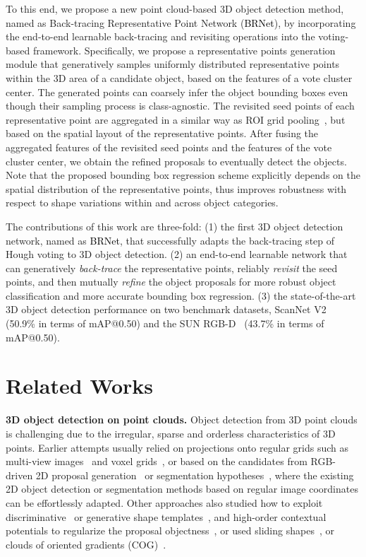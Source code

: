 \documentclass[final]{cvpr}
\newcommand{\methodnospace}{\textcolor{black}{BRNet}}
\begin{document}
To this end, we propose a new point cloud-based 3D object detection method, named as Back-tracing Representative Point Network (\methodnospace), by incorporating the end-to-end learnable back-tracing and revisiting operations into the voting-based framework.
Specifically, we propose a representative points generation module that generatively samples uniformly distributed representative points within the 3D area of a candidate object, based on the features of a vote cluster center.
The generated points can coarsely infer the object bounding boxes even though their sampling process is class-agnostic.
The revisited seed points of each representative point are aggregated in a similar way as ROI grid pooling~\cite{pvrcnn}, but based on the spatial layout of the representative points.
After fusing the aggregated features of the revisited seed points and the features of the vote cluster center, we obtain the refined proposals to eventually detect the objects.
Note that the proposed bounding box regression scheme explicitly depends on the spatial distribution of the representative points, thus improves robustness with respect to shape variations within and across object categories.

The contributions of this work are three-fold:
(1) the first 3D object detection network, named as \methodnospace, that successfully adapts the back-tracing step of Hough voting to 3D object detection.
(2) an end-to-end learnable network that can generatively \emph{back-trace} the representative points, reliably \emph{revisit} the seed points, and then mutually \emph{refine} the object proposals for more robust object classification and more accurate bounding box regression.
(3) the state-of-the-art 3D object detection performance on two benchmark datasets, ScanNet V2~\cite{scannet} (50.9\% in terms of mAP@0.50) and the SUN RGB-D~\cite{sunrgb-d} (43.7\% in terms of mAP@0.50).

\section{Related Works}
\label{sec:related_works}

\noindent\textbf{3D object detection on point clouds.}
Object detection from 3D point clouds is challenging due to the irregular, sparse and orderless characteristics of 3D points.
Earlier attempts usually relied on projections onto regular grids such as multi-view images~\cite{chen2017multi} and voxel grids~\cite{zhou2018voxelnet, yan2018second, lang2019pointpillars, 3d-sis, partA2}, or based on the candidates from RGB-driven 2D proposal generation~\cite{f-pointnet,2d-driven} or segmentation hypotheses~\cite{kim2013accurate}, where the existing 2D object detection or segmentation methods based on regular image coordinates can be effortlessly adapted.
Other approaches also studied how to exploit discriminative~\cite{li2015database,nan2012search} or generative shape templates~\cite{gspn}, and high-order contextual potentials to regularize the proposal objectness~\cite{lin2013holistic}, or used sliding shapes~\cite{dss,song2014sliding}, or clouds of oriented gradients (COG)~\cite{cog}.
\end{document}
